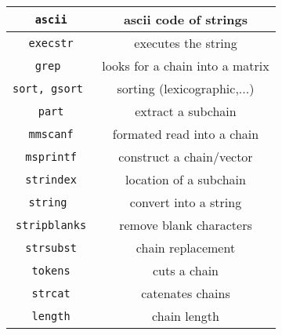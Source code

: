 \begin{center}
\begin{tabular}{|c|c|}
\hline
\verb!ascii! & ascii code of strings\\ \hline

\verb!execstr! & executes the string\\ \hline

\verb!grep ! & looks for a chain into a matrix \\ \hline

\verb!sort, gsort ! & sorting (lexicographic,...) \\ \hline

\verb!part! & extract a subchain  \\ \hline

\verb!mmscanf! & formated read into a chain \\ \hline

\verb!msprintf! & construct a chain/vector   \\ \hline

\verb!strindex! & location of a subchain \\ \hline

\verb!string ! & convert into a string \\ \hline

\verb!stripblanks! & remove blank characters \\ \hline

\verb!strsubst! & chain replacement \\ \hline

\verb!tokens! &  cuts a chain \\ \hline

\verb!strcat! & catenates chains  \\ \hline

\verb!length! &  chain length  \\ \hline
\end{tabular}
\end{center}


